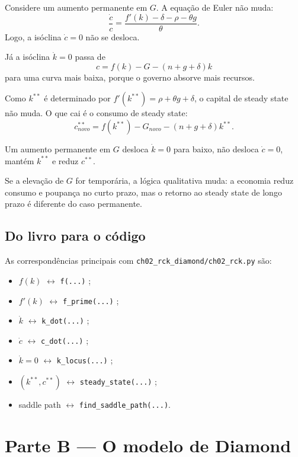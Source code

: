 \documentclass[11pt,a4paper]{article}
\begin{document}
Considere um aumento permanente em \(G\). A equa\c{c}\~ao de Euler n\~ao muda:
\[
\frac{\dot c}{c}
=
\frac{f'(k)-\delta-\rho-\theta g}{\theta}.
\]
Logo, a is\'oclina \(\dot c=0\) n\~ao se desloca.

J\'a a is\'oclina \(\dot k=0\) passa de
\[
c=f(k)-G-(n+g+\delta)k
\]
para uma curva mais baixa, porque o governo absorve mais recursos.

Como \(k^{\ast\ast}\) \'e determinado por \(f'(k^{\ast\ast})=\rho+\theta g+\delta\),
o capital de steady state n\~ao muda. O que cai \'e o consumo de steady state:
\[
c^{\ast\ast}_{novo}
=
f(k^{\ast\ast})-G_{novo}-(n+g+\delta)k^{\ast\ast}.
\]

\begin{resultado}
Um aumento permanente em \(G\) desloca \(\dot k=0\) para baixo, n\~ao desloca
\(\dot c=0\), mant\'em \(k^{\ast\ast}\) e reduz \(c^{\ast\ast}\).
\end{resultado}

Se a eleva\c{c}\~ao de \(G\) for tempor\'aria, a l\'ogica qualitativa muda:
a economia reduz consumo e poupan\c{c}a no curto prazo, mas o retorno ao steady
state de longo prazo \'e diferente do caso permanente.

\subsection{Do livro para o c\'odigo}

As correspond\^encias principais com
\texttt{ch02\_rck\_diamond/ch02\_rck.py} s\~ao:
\begin{itemize}
  \item \(f(k)\) \(\leftrightarrow\) \texttt{f(...)} ;
  \item \(f'(k)\) \(\leftrightarrow\) \texttt{f\_prime(...)} ;
  \item \(\dot k\) \(\leftrightarrow\) \texttt{k\_dot(...)} ;
  \item \(\dot c\) \(\leftrightarrow\) \texttt{c\_dot(...)} ;
  \item \(\dot k=0\) \(\leftrightarrow\) \texttt{k\_locus(...)} ;
  \item \((k^{\ast\ast},c^{\ast\ast})\) \(\leftrightarrow\) \texttt{steady\_state(...)} ;
  \item saddle path \(\leftrightarrow\) \texttt{find\_saddle\_path(...)}.
\end{itemize}

\section{Parte B --- O modelo de Diamond}
\end{document}
